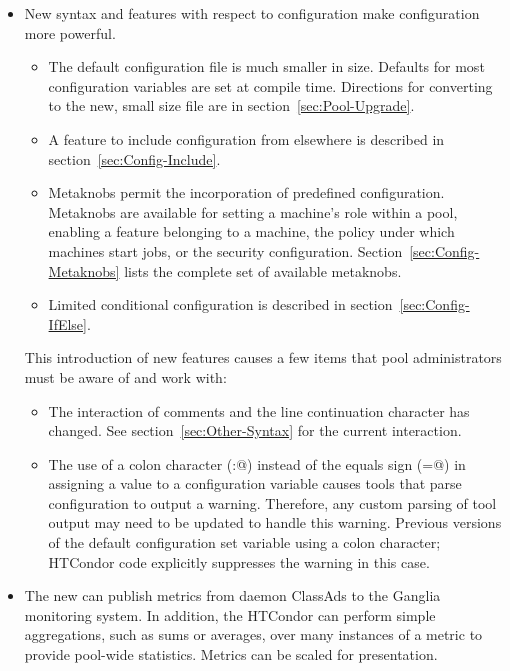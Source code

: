 \begin{itemize}

\item New syntax and features with respect to configuration
make configuration more powerful.
  \begin{itemize}
  \item The default configuration file is much smaller in size.
   Defaults for most configuration variables are set at compile time.
   Directions for converting to the new, small size file are in
   section~\ref{sec:Pool-Upgrade}.
  \item A feature to include configuration from elsewhere
   is described in section~\ref{sec:Config-Include}.
  \item Metaknobs permit the incorporation of predefined configuration.
   Metaknobs are available for setting a machine's role within
   a pool, enabling a feature belonging to a machine, the policy under which
   machines start jobs, or the security configuration.
   Section~\ref{sec:Config-Metaknobs} lists the complete set of available
   metaknobs.
  \item Limited conditional configuration is described in 
   section~\ref{sec:Config-IfElse}.
  \end{itemize}
This introduction of new features causes a few items that pool
administrators must be aware of and work with:
  \begin{itemize}
  \item The interaction of comments and the line continuation character
   has changed.  See  section~\ref{sec:Other-Syntax} for the current
   interaction. 
  \item The use of a colon character (\verb@:@) instead of the
   equals sign (\verb@=@) in assigning a value to a configuration variable
   causes tools that parse configuration to output a warning.
   Therefore, any custom parsing of tool output may need to be updated to
   handle this warning.
   Previous versions of the default configuration set variable
    using a colon character;
   HTCondor code explicitly suppresses the warning in this case.
  \end{itemize}

\item The new  can publish metrics from daemon ClassAds 
to the Ganglia monitoring system.
In addition, the HTCondor can perform simple aggregations, 
such as sums or averages, 
over many instances of a metric to provide pool-wide statistics.
Metrics can be scaled for presentation. 


\end{itemize}
